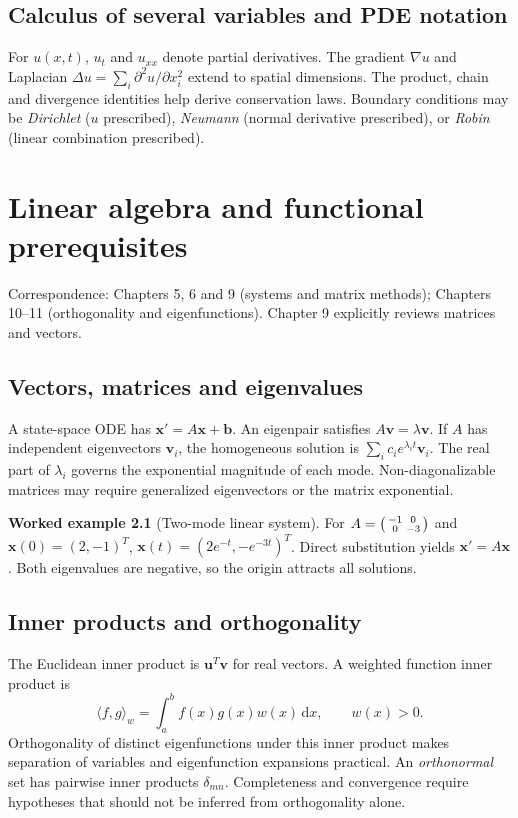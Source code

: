 \documentclass[11pt,letterpaper,oneside]{report}
\theoremstyle{definition}\newtheorem{definition}[theorem]{Definition}
\newtheorem{example}[theorem]{Worked example}
\theoremstyle{remark}\newtheorem{remark}[theorem]{Remark}
\newcommand{\dd}{\,\mathrm{d}}
\begin{document}
\section{Calculus of several variables and PDE notation}
For $u(x,t)$, $u_t$ and $u_{xx}$ denote partial derivatives. The gradient $\nabla u$ and Laplacian $\Delta u=\sum_i\partial^2u/\partial x_i^2$ extend to spatial dimensions. The product, chain and divergence identities help derive conservation laws. Boundary conditions may be \emph{Dirichlet} ($u$ prescribed), \emph{Neumann} (normal derivative prescribed), or \emph{Robin} (linear combination prescribed).
\chapter{Linear algebra and functional prerequisites}
\begin{bookground}Correspondence: Chapters 5, 6 and 9 (systems and matrix methods); Chapters 10--11 (orthogonality and eigenfunctions). Chapter 9 explicitly reviews matrices and vectors.\end{bookground}
\section{Vectors, matrices and eigenvalues}
A state-space ODE has $\mathbf x'=A\mathbf x+\mathbf b$. An eigenpair satisfies $A\mathbf v=\lambda\mathbf v$. If $A$ has independent eigenvectors $\mathbf v_i$, the homogeneous solution is $\sum_i c_i e^{\lambda_i t}\mathbf v_i$. The real part of $\lambda_i$ governs the exponential magnitude of each mode. Non-diagonalizable matrices may require generalized eigenvectors or the matrix exponential.
\begin{example}[Two-mode linear system]
For $A=\begin{psmallmatrix}-1&0\\0&-3\end{psmallmatrix}$ and $\mathbf x(0)=(2,-1)^T$, $\mathbf x(t)=(2e^{-t},-e^{-3t})^T$. Direct substitution yields $\mathbf x'=A\mathbf x$. Both eigenvalues are negative, so the origin attracts all solutions.
\end{example}
\section{Inner products and orthogonality}
The Euclidean inner product is $\mathbf u^T\mathbf v$ for real vectors. A weighted function inner product is
\[\langle f,g\rangle_w=\int_a^b f(x)g(x)w(x)\dd x,\qquad w(x)>0.\]
Orthogonality of distinct eigenfunctions under this inner product makes separation of variables and eigenfunction expansions practical. An \emph{orthonormal} set has pairwise inner products $\delta_{mn}$. Completeness and convergence require hypotheses that should not be inferred from orthogonality alone.
\end{document}
